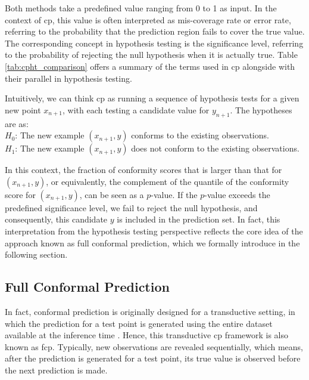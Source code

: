 \vspace{0.5em} 	  	
Both methods take a predefined value ranging from 0 to 1 as input. In the context of \gls{cp}, this value is often interpreted as mis-coverage rate or error rate, referring to the probability that the prediction region fails to cover the true value. The corresponding concept in hypothesis testing is the significance level, referring to the probability of rejecting the null hypothesis when it is actually true. Table \ref{tab:cpht_comparison} offers a summary of the terms used in \gls{cp} alongside with their parallel in hypothesis testing.

Intuitively, we can think \gls{cp} as running a sequence of hypothesis tests for a given new point $x_{n+1}$, with each testing a candidate value for $y_{n+1}$. The hypotheses are as: \\

\vspace{-0.3em}
\indent $H_0$: The new example $(x_{n+1}, y)$ conforms to the existing observations. \\
\indent	$H_1$: The new example $(x_{n+1}, y)$ does not conform to the existing observations. \\
\vspace{-0.3em}

\noindent In this context, the fraction of conformity scores that is larger than that for $(x_{n+1}, y)$, or equivalently, the complement of the quantile of the conformity score for $(x_{n+1}, y)$, can be seen as a $p$-value. If the $p$-value exceeds the predefined significance level, we fail to reject the null hypothesis, and consequently, this candidate $y$ is included in the prediction set. In fact, this interpretation from the hypothesis testing perspective reflects the core idea of the approach known as full conformal prediction, which we formally introduce in the following section.

\subsection{Full Conformal Prediction}
In fact, conformal prediction is originally designed for a transductive setting, in which the prediction for a test point is generated using the entire dataset available at the inference time \cite{gammerman1998learning}. Hence, this transductive \gls{cp} framework is also known as \gls{fcp}. Typically, new observations are revealed sequentially, which means, after the prediction is generated for a test point, its true value is observed before the next prediction is made. 

